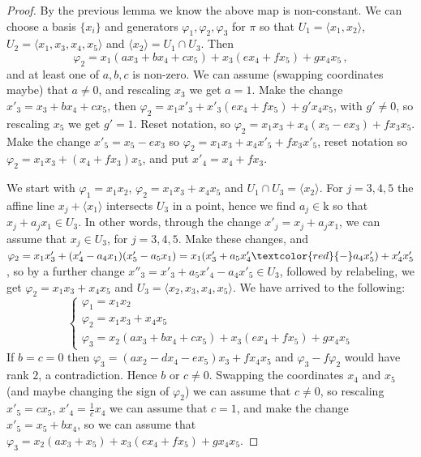 \documentclass[10pt,reqno]{amsart}
\newcommand{\la}{\langle}
\newcommand{\ra}{\rangle}
\newcommand{\f}{\varphi}
\newcommand{\kk}{\mathrm{k}}
\theoremstyle{definition}
\begin{document}
\begin{proof}
By the previous lemma we know the above map is non-constant. We can choose a basis $\{x_i\}$ and generators $\f_1, \f_2, \f_3$ for $\pi$ so that $U_1=\la x_1, x_2 \ra$, $U_2=\la x_1, x_3,x_4,x_5 \ra$ and $\la x_2 \ra= U_1 \cap U_3$. Then 
\[
\f_2=x_1(ax_3+bx_4+cx_5)+x_3(ex_4+fx_5)+gx_4x_5\,,
\]
and at least one of $a, b,c$ is non-zero. We can assume (swapping coordinates maybe) that $a \ne 0$, and rescaling $x_3$ we get $a=1$. Make the change $x'_3=x_3+bx_4+cx_5$, then $\f_2=x_1x'_3+x'_3(ex_4+fx_5)+g'x_4x_5$, with $g' \ne 0$, so rescaling $x_5$ we get $g'=1$. Reset notation, so $\f_2=x_1x_3+x_4(x_5-ex_3)+fx_3x_5$. Make the change $x'_5=x_5-ex_3$ so $\f_2=x_1x_3+x_4x'_5+fx_3x'_5$, reset notation so $\f_2=x_1x_3+(x_4+fx_3)x_5$, and put $x'_4=x_4+fx_3$. 

\item We start with $\f_1=x_1x_2$, $\f_2=x_1x_3+x_4x_5$ and $U_1\cap U_3=\la x_2 \ra$. For $j=3,4,5$ the affine line $x_j + \la x_1 \ra$ intersects $U_3$ in a point, hence we find $a_j \in \kk$ so that $x_j+a_jx_1 \in U_3$. In other words, through the change $x'_j=x_j+a_jx_1$, we can assume that $x_j \in U_3$, for $j=3,4,5$. Make these changes, and $\f_2=x_1x'_3+(x'_4-a_4x_1)(x'_5-a_5x_1)=x_1(x'_3+a_5x'_4\textcolor{red}{-}a_4x'_5)+x'_4x'_5$, so by a further change $x''_3=x'_3+a_5x'_4-a_4x'_5 \in U_3$, followed by relabeling, we get $\f_2=x_1x_3+x_4x_5$ and $U_3=\la x_2,x_3,x_4, x_5 \ra$. We have arrived to the following:
\[
\begin{cases}
    \f_1=x_1x_2 \\
    \f_2=x_1x_3+x_4x_5 \\
    \f_3=x_2(ax_3+bx_4+cx_5)+x_3(ex_4+fx_5)+gx_4x_5
\end{cases}
\]
If $b=c=0$ then $\f_3=(ax_2-dx_4-ex_5)x_3+fx_4x_5$ and $\f_3-f\f_2$ would have rank $2$, a contradiction. Hence $b$ or $c \ne 0$. Swapping the coordinates $x_4$ and $x_5$ (and maybe changing the sign of $\f_2$) we can assume that $c \ne 0$, so rescaling $x'_5=cx_5$, $x'_4=\frac1c x_4$ we can assume that $c=1$, and make the change $x'_5=x_5+bx_4$, so we can assume that $\f_3=x_2(ax_3+x_5)+x_3(ex_4+fx_5)+gx_4x_5$.


\end{proof}
\end{document}
